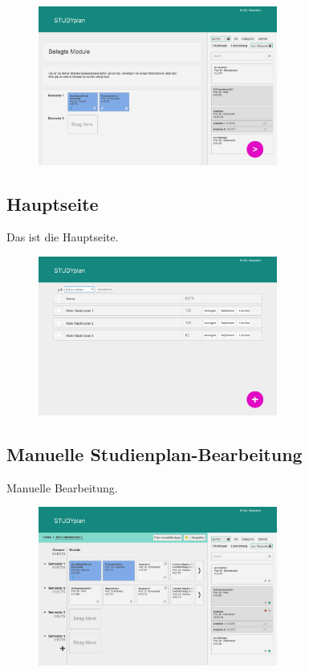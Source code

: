 \begin{figure}[!htb]
	\caption{}
	\label{fig:gui-registrierung-2}
	\centering
	\includegraphics[width=0.7\textwidth]{../GUI/ergebnisse/registrierung-2.png}
\end{figure}


\subsection{Hauptseite}
Das ist die Hauptseite.
\begin{figure}[!htb]
	\caption{}
	\label{fig:gui-hauptseite-1}
	\centering
	\includegraphics[width=0.7\textwidth]{../GUI/ergebnisse/hauptseite-1.png}
\end{figure}

\subsection{Manuelle Studienplan-Bearbeitung}
Manuelle Bearbeitung.
\begin{figure}[!htb]
	\caption{}
	\label{fig:gui-bearbeitung-1}
	\centering
	\includegraphics[width=0.7\textwidth]{../GUI/ergebnisse/bearbeitung-1.png}
\end{figure}

